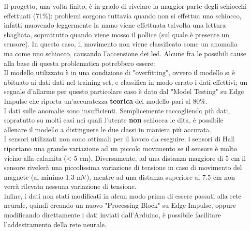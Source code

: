 

\label{98-Conclusioni}
Il progetto, una volta finito, è in grado di rivelare la maggior parte degli schiocchi effettuati (71\%): problemi sorgono tuttavia quando non si effettua uno schiocco, infatti muovendo leggermente la mano viene effettuata talvolta una lettura sbagliata, soprattutto quando viene mosso il pollice (sul quale è presente un sensore). In questo caso, il movimento non viene classificato come un anomalia ma come uno schiocco, causando l'accensione dei led.
Alcune fra le possibili cause alla base di questa problematica potrebbero essere:\\

\noindent{}Il modello utilizzato è in una condizione di "overfitting", ovvero il modello si è abituato ai dati dati nel training set, e classifica in modo errato i dati effettivi; un segnale d'allarme per questo particolare caso è dato dal "Model Testing" su Edge Impulse che riporta un'accuratezza \textbf{teorica} del modello pari al 80\%.\\

\noindent{}I dati sulle anomalie sono insufficienti. Semplicemente raccogliendo più dati, sopratutto su molti casi nei quali l'utente \textbf{non} schiocca le dita, è possibile allenare il modello a distinguere le due classi in maniera più accurata.\\

\noindent{}I sensori utilizzati non sono ottimali per il lavoro da eseguire; i sensori di Hall riportano una grande variazione ad un piccolo movimento se il sensore è molto vicino alla calamita (< 5 cm). Diversamente, ad una distanza maggiore di 5 cm il sensore rivelerà una piccolissima variazione di tensione in caso di movimento del magnete (al minimo 1.3 mV), mentre ad una distanza superiore ai 7.5 cm non verrà rilevata nessuna variazione di tensione.\\

\noindent{}Infine, i dati non stati modificati in alcun modo prima di essere passati alla rete neurale, quindi creando un nuovo "Processing Block" su Edge Impulse, oppure modificando direttamente i dati inviati dall'Arduino, è possibile facilitare l'addestramento della rete neurale.\\